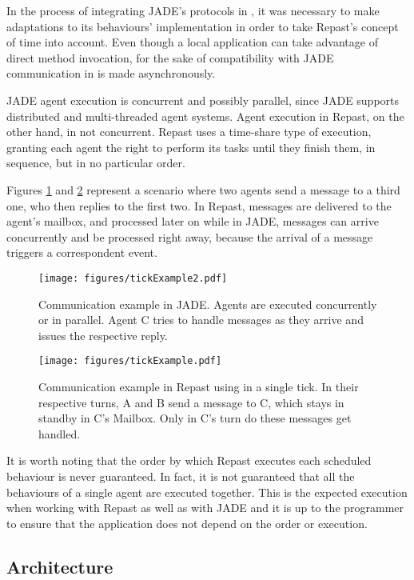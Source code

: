 In the process of integrating JADE's protocols in \apiname{}, it was necessary to make adaptations to its behaviours' implementation in order to take Repast's concept of time into account. Even though a local application can take advantage of direct method invocation, for the sake of compatibility with JADE communication in \apiname{} is made asynchronously.

JADE agent execution is concurrent and possibly parallel, since JADE supports distributed and multi-threaded agent systems. Agent execution in Repast, on the other hand, in not concurrent. Repast uses a time-share type of execution, granting each agent the right to perform its tasks until they finish them, in sequence, but in no particular order.

Figures \ref{fig:com-example-jade} and \ref{fig:com-example-repast} represent a scenario where two agents send a message to a third one, who then replies to the first two. In Repast, messages are delivered to the agent's mailbox, and processed later on while in JADE, messages can arrive concurrently and be processed right away, because the arrival of a message triggers a correspondent event.

\begin{figure}
	\centering
	\texttt{[image: figures/tickExample2.pdf]}
	\caption{
		Communication example in JADE. Agents are executed concurrently or in parallel. Agent C tries to handle messages as they arrive and issues the respective reply.
	}
	\label{fig:com-example-jade}
\end{figure}

\begin{figure}
	\centering
	\texttt{[image: figures/tickExample.pdf]}
	\caption{
		Communication example in Repast using \apiname{} in a single tick. In their respective turns, A and B send a message to C, which stays in standby in C's Mailbox. Only in C's turn do these messages get handled.
	}
	\label{fig:com-example-repast}
\end{figure}

It is worth noting that the order by which Repast executes each scheduled behaviour is never guaranteed. In fact, it is not guaranteed that all the behaviours of a single agent are executed together. This is the expected execution when working with Repast as well as with JADE and it is up to the programmer to ensure that the application does not depend on the order or execution.

\subsection{Architecture}

